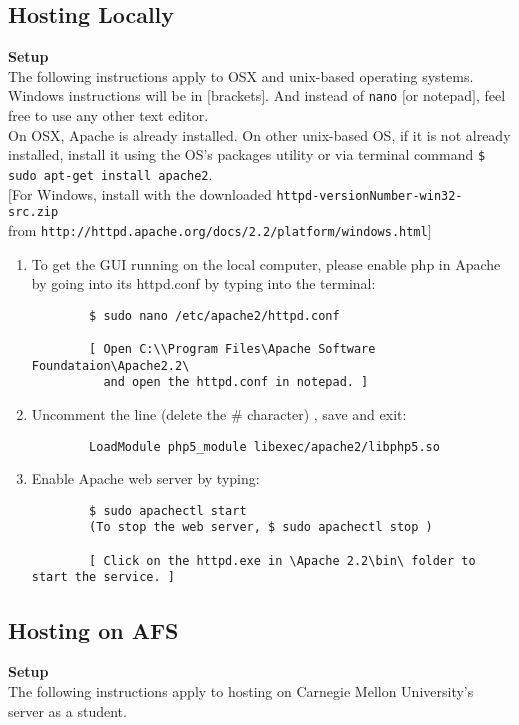 \documentclass[11pt]{article}
\begin{document}
\subsection{Hosting Locally}
\textbf{Setup}\\
The following instructions apply to OSX and unix-based operating systems. Windows instructions will be in $[$brackets$]$. And instead of \texttt{nano} $[$or notepad$]$, feel free to use any other text editor.\\
On OSX, Apache is already installed. On other unix-based OS, if it is not already installed, install it using the OS's packages utility or via terminal command \texttt{\$ sudo apt-get install apache2}.\\
$[$For Windows, install with the downloaded \texttt{httpd-versionNumber-win32-src.zip}\\
 from \texttt{http://httpd.apache.org/docs/2.2/platform/windows.html}$]$\\
\begin{enumerate}
	\item To get the GUI running on the local computer, please enable php in Apache by going into its httpd.conf by typing into the terminal:
		\begin{verbatim}
		$ sudo nano /etc/apache2/httpd.conf
		
		[ Open C:\\Program Files\Apache Software Foundataion\Apache2.2\
		  and open the httpd.conf in notepad. ]
		\end{verbatim}
	\item Uncomment the line (delete the \# character) , save and exit:
		\begin{verbatim}
		LoadModule php5_module libexec/apache2/libphp5.so
		\end{verbatim}
	\item Enable Apache web server by typing:
		\begin{verbatim}
		$ sudo apachectl start
		(To stop the web server, $ sudo apachectl stop )
			
		[ Click on the httpd.exe in \Apache 2.2\bin\ folder to start the service. ]
		\end{verbatim}
\end{enumerate}
\bigskip

\subsection{Hosting on AFS}
\textbf{Setup}\\
The following instructions apply to hosting on Carnegie Mellon University's server as a student.
\end{document}
